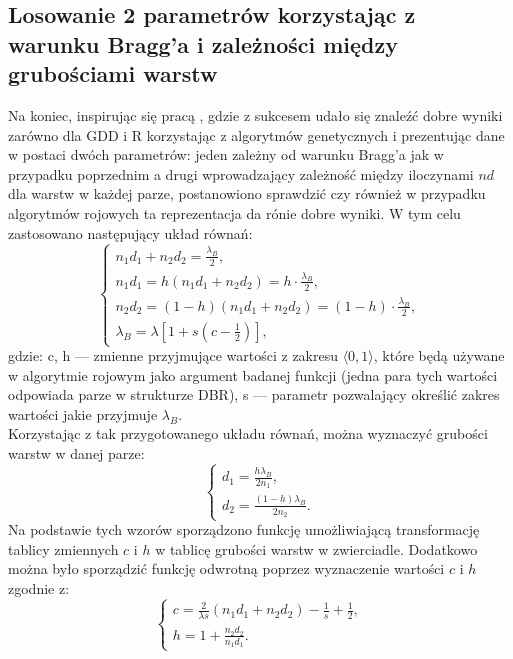 \subsection{Losowanie 2 parametrów korzystając z warunku Bragg'a i zależności między grubościami warstw} %
Na koniec, inspirując się pracą \cite{dbr2}, gdzie z sukcesem udało się znaleźć dobre wyniki zarówno dla GDD i R korzystając z algorytmów genetycznych i prezentując dane w postaci dwóch parametrów: jeden zależny od warunku Bragg'a jak w przypadku poprzednim a drugi wprowadzający zależność między iloczynami $nd$ dla warstw w każdej parze, postanowiono sprawdzić czy również w przypadku algorytmów rojowych ta reprezentacja da rónie dobre wyniki. W tym celu zastosowano następujący układ równań:
\begin{equation}
    \left\{\begin{array}{l}
         n_1d_1 + n_2d_2 = \frac{\lambda_B}{2},  \\
         n_1d_1=h(n_1d_1 + n_2d_2) = h \cdot\frac{\lambda_B}{2}, \\
          n_2d_2=(1-h)(n_1d_1 + n_2d_2) = (1-h) \cdot\frac{\lambda_B}{2}, \\
          \lambda_B=\lambda\left[1+s\left(c-\frac 12\right)\right],
    \end{array}\right.
\end{equation}
gdzie: c, h --- zmienne przyjmujące wartości z zakresu $\langle0, 1\rangle$, które będą używane w algorytmie rojowym jako argument badanej funkcji (jedna para tych wartości odpowiada parze w strukturze DBR), s --- parametr pozwalający określić zakres wartości jakie przyjmuje $\lambda_B$. \\
Korzystając z tak przygotowanego układu równań, można wyznaczyć grubości warstw w danej parze:
\begin{equation}
    \left\{ \begin{array}{l}
         d_1 = \displaystyle\frac{h\lambda_B}{2n_1}, \\ d_2 = \displaystyle\frac{(1-h)\lambda_B}{2n_2}.
    \end{array}\right.
\end{equation}
Na podstawie tych wzorów sporządzono funkcję umożliwiającą transformację tablicy zmiennych $c$ i $h$ w tablicę grubości warstw w zwierciadle. Dodatkowo można było sporządzić funkcję odwrotną poprzez wyznaczenie wartości $c$ i $h$ zgodnie z:
\begin{equation}
    \left\{\begin{array}{l}
          c = \displaystyle\frac{2}{\lambda s}(n_1d_1 + n_2d_2) - \frac 1s + \frac 12, \\
           h = 1 + \displaystyle\frac{n_2d_2}{n_1d_1}.
    \end{array}\right.
\end{equation}


